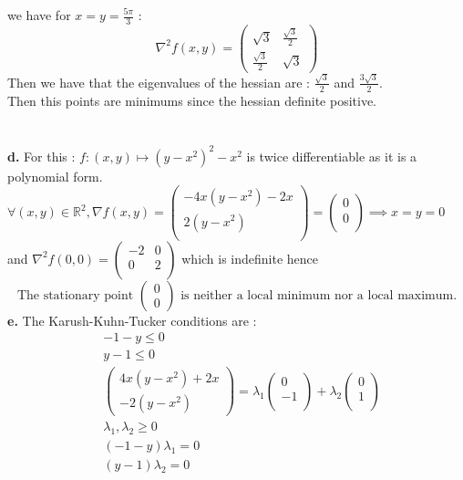 \documentclass{article}
\begin{document}
we have for $x=y=\frac{5\pi}{3}$  : 
$$ \nabla^2 f (x,y)=\begin{pmatrix}
\sqrt{3} & \frac{\sqrt{3}}{2} \\
\frac{\sqrt{3}}{2} & \sqrt{3}
\end{pmatrix} $$
Then we have that the eigenvalues of the hessian are : $\frac{\sqrt{3}}{2}$ and $\frac{3\sqrt{3}}{2}$. \\
Then this points are minimums since the hessian definite positive.\\
\\\\
\textbf{d.} For this : $f:(x,y)\mapsto (y-x^2)^2-x^2$ is twice differentiable as it is a polynomial form.
\\
$\forall (x,y)\in\mathbb{R}^2, \nabla f(x,y) = \begin{pmatrix}
    -4x(y-x^2)-2x\\
    2(y-x^2)\\
\end{pmatrix} = \begin{pmatrix}
    0\\
    0\\
\end{pmatrix} \implies x=y=0$ and $\nabla^2 f(0,0) = \begin{pmatrix}
    -2&0\\
    0&2\\
\end{pmatrix}$ which is indefinite hence $$\boxed{\text{The stationary point }\begin{pmatrix}
    0\\
    0
\end{pmatrix}\text{ is neither a local minimum nor a local maximum.}}$$
\textbf{e.} The Karush-Kuhn-Tucker conditions are : \begin{equation*}
    \begin{split}
        &-1-y\leq 0\\
        &y-1\leq 0\\
        &\begin{pmatrix}
            4x(y-x^2)+2x\\
            -2(y-x^2)\end{pmatrix} = \lambda_1\begin{pmatrix}
            0\\
            -1\\\end{pmatrix}+\lambda_2 \begin{pmatrix}
            0\\
            1\\\end{pmatrix}\\
        &\lambda_1,\lambda_2\ge 0\\
        &(-1-y)\lambda_1 = 0\\
        &(y-1)\lambda_2 = 0\\
    \end{split}
\end{equation*}
\end{document}
